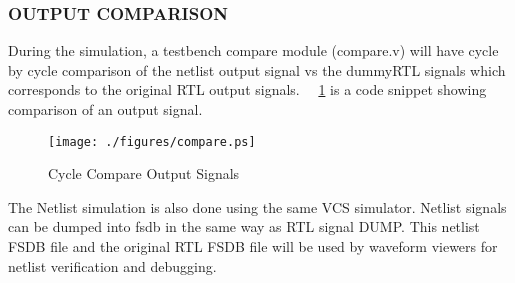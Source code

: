 \subsubsection{OUTPUT COMPARISON}

During the simulation, a testbench compare module (compare.v) will have cycle by cycle comparison of the netlist output signal vs the dummyRTL signals which corresponds to the original RTL output signals. ~\figurename{~\ref{fig:compare.ps}} is a code snippet showing comparison of an output signal. 

\begin{figure}[h]
\centering
\texttt{[image: ./figures/compare.ps]}
\caption{Cycle Compare Output Signals}
\label{fig:compare.ps}
\end{figure}

The Netlist simulation is also done using the same VCS simulator. Netlist signals can be dumped into fsdb in the same way as RTL signal DUMP. This netlist FSDB file and the original RTL FSDB file will be used by waveform viewers for netlist verification and debugging.


%


